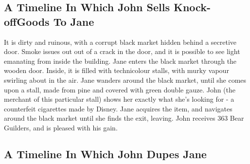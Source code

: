 \documentclass{article}
\begin{document}
\subsection{A Timeline In Which John Sells Knock{-}offGoods To Jane}


It is dirty and ruinous, with a corrupt black market hidden behind a secretive door.
Smoke issues out out of a crack in the door, and it is possible to see light emanating from inside the building.
Jane enters the black market through the wooden door.
Inside, it is filled with technicolour stalls, with murky vapour swirling about in the air.
Jane wanders around the black market, until she comes upon a stall, made from pine and covered with green double gauze.
John (the merchant of this particular stall) shows her exactly what she's looking for {-} a counterfeit cigarettes made by Disney.
Jane acquires the item, and navigates around the black market until she finds the exit, leaving.
John receives 363 Bear Guilders, and is pleased with his gain.
\subsection{A Timeline In Which John Dupes Jane}
\end{document}
